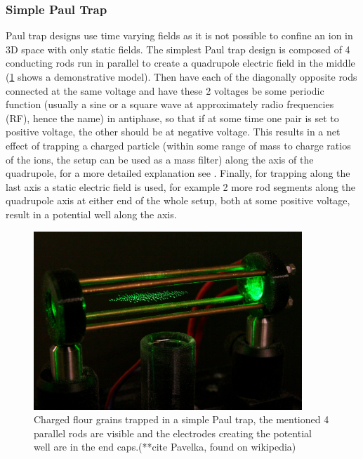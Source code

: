 \subsubsection{Simple Paul Trap}
Paul trap designs use time varying fields as it is not possible to confine an ion in 3D space with only static fields.
The simplest Paul trap design is composed of 4 conducting rods run in parallel to create a quadrupole electric field in the middle (\cref{fig:TIQC_RFQ_Flour} shows a demonstrative model).
Then have each of the diagonally opposite rods connected at the same voltage and have these 2 voltages be some periodic function (usually a sine or a square wave at approximately radio frequencies (RF), hence the name) in antiphase, so that if at some time one pair is set to positive voltage, the other should be at negative voltage.
This results in a net effect of trapping a charged particle (within some range of mass to charge ratios of the ions, the setup can be used as a mass filter) along the axis of the quadrupole, for a more detailed explanation see \cite{paulElectromagneticTrapsCharged1990}.
Finally, for trapping along the last axis a static electric field is used, for example 2 more rod segments along the quadrupole axis at either end of the whole setup, both at some positive voltage, result in a potential well along the axis.

\begin{figure}[H]
    \centering
    \includegraphics[width=0.9\textwidth]{images/TIQC_RFQ_Flour.jpg}
    \caption{Charged flour grains trapped in a simple Paul trap, the mentioned 4 parallel rods are visible and the electrodes creating the potential well are in the end caps.(**cite Pavelka, found on wikipedia)}\label{fig:TIQC_RFQ_Flour}
\end{figure}

